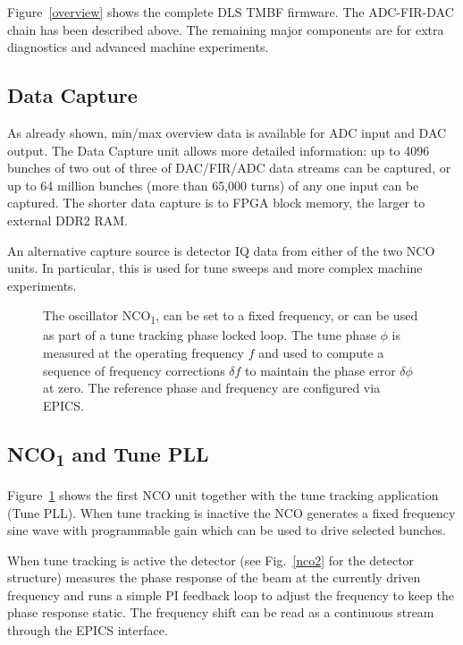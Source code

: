 \documentclass{jacow}
\newcommand{\squarecaption}[2][1]{\caption[#1]{#2\unskip\parfillskip 0pt}}
\begin{document}
Figure~\ref{overview} shows the complete DLS TMBF firmware.  The ADC-FIR-DAC
chain has been described above.  The remaining major components are for extra
diagnostics and advanced machine experiments.

\subsection{Data Capture}

As already shown, min/max overview data is available for ADC input and DAC
output.  The Data Capture unit allows more detailed information: up to 4096
bunches of two out of three of DAC/FIR/ADC data streams can be captured, or up
to 64 million bunches (more than 65,000 turns) of any one input can be captured.
The shorter data capture is to FPGA block memory, the larger to external DDR2
RAM.

An alternative capture source is detector IQ data from either of the two NCO
units.  In particular, this is used for tune sweeps and more complex machine
experiments.


\begin{figure}[hbt]
\begin{centering}

\end{centering}
\squarecaption{
The oscillator NCO\textsubscript1, can be set to a fixed frequency, or
can be used as part of a tune tracking phase locked loop.  The tune phase $\phi$
is measured at the operating frequency $f$ and used to compute a sequence of
frequency corrections $\delta\!f$ to maintain the phase error $\delta\phi$ at
zero.  The reference phase and frequency are configured via EPICS.
}
\label{nco1}
\end{figure}


\subsection{NCO\textsubscript1 and Tune PLL}

Figure~\ref{nco1} shows the first NCO unit together with the tune tracking
application (Tune PLL).  When tune tracking is inactive the NCO generates a
fixed frequency sine wave with programmable gain which can be used to drive
selected bunches.

When tune tracking is active the detector (see Fig.~\ref{nco2} for the detector
structure) measures the phase response of the beam at the currently driven
frequency and runs a simple PI feedback loop to adjust the frequency to keep the
phase response static.  The frequency shift can be read as a continuous stream
through the EPICS interface.
\end{document}
